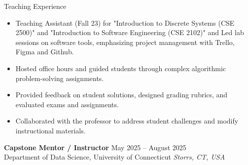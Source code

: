 \begin{rSection}{Teaching Experience}
\begin{itemize}
    \item Teaching Assistant (Fall 23) for "Introduction to Discrete Systems (CSE 2500)" and "Introduction to Software Engineering (CSE 2102)" and Led lab sessions on software tools, emphasizing project management with Trello, Figma and Github.
    \item Hosted office hours and guided students through complex algorithmic problem-solving assignments.  
    \item Provided feedback on student solutions, designed grading rubrics, and evaluated exams and assignments.  
    \item Collaborated with the professor to address student challenges and modify instructional materials. 
 \end{itemize}

\textbf{Capstone Mentor / Instructor} \hfill {May 2025 -- August 2025}\\
Department of Data Science, University of Connecticut \hfill \textit{Storrs, CT, USA}


\end{rSection}
